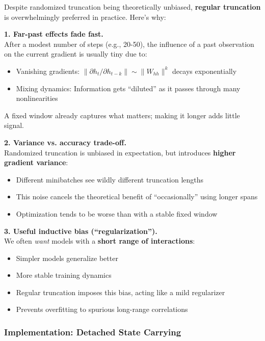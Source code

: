 \documentclass{article}
\begin{document}
Despite randomized truncation being theoretically unbiased, \textbf{regular truncation} is overwhelmingly preferred in practice. Here's why:

\begin{tcolorbox}[colback=green!5!white, colframe=green!50!black, title=The Three Pillars of Regular Truncation's Success]

\textbf{1. Far-past effects fade fast.} \\
After a modest number of steps (e.g., 20-50), the influence of a past observation on the current gradient is usually tiny due to:
\begin{itemize}
\item Vanishing gradients: $\|\partial h_t / \partial h_{t-k}\| \sim \|W_{hh}\|^k$ decays exponentially
\item Mixing dynamics: Information gets ``diluted'' as it passes through many nonlinearities
\end{itemize}
A fixed window already captures what matters; making it longer adds little signal.

\textbf{2. Variance vs. accuracy trade-off.} \\
Randomized truncation is unbiased in expectation, but introduces \textbf{higher gradient variance}:
\begin{itemize}
\item Different minibatches see wildly different truncation lengths
\item This noise cancels the theoretical benefit of ``occasionally'' using longer spans
\item Optimization tends to be worse than with a stable fixed window
\end{itemize}

\textbf{3. Useful inductive bias (``regularization'').} \\
We often \textit{want} models with a \textbf{short range of interactions}:
\begin{itemize}
\item Simpler models generalize better
\item More stable training dynamics
\item Regular truncation imposes this bias, acting like a mild regularizer
\item Prevents overfitting to spurious long-range correlations
\end{itemize}
\end{tcolorbox}

\subsubsection{Implementation: Detached State Carrying}
\end{document}
